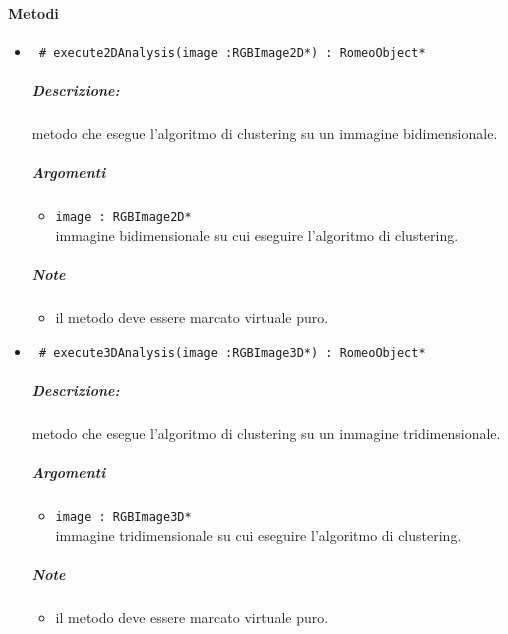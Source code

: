 \paragraph{Metodi\\}
	\begin{itemize}
		\item \color{blue}\verb! # execute2DAnalysis(image :RGBImage2D*) : RomeoObject* !\\
			\color{black}
			\subparagraph{Descrizione:} metodo che esegue l'algoritmo di clustering su un immagine bidimensionale.
			\subparagraph{Argomenti}
				\begin{itemize}
					\item \color{RoyalPurple}\verb!image : RGBImage2D*!\\
					\color{black} immagine bidimensionale su cui eseguire l'algoritmo di clustering.
				\end{itemize}
				\subparagraph{Note}
				\begin{itemize}
					\item il metodo deve essere marcato virtuale puro.
				\end{itemize}
				
		\item \color{blue}\verb! # execute3DAnalysis(image :RGBImage3D*) : RomeoObject* !\\
			\color{black}
			\subparagraph{Descrizione:} metodo che esegue l'algoritmo di clustering su un immagine tridimensionale.
			\subparagraph{Argomenti}
				\begin{itemize}
					\item \color{RoyalPurple}\verb!image : RGBImage3D*!\\
					\color{black} immagine tridimensionale su cui eseguire l'algoritmo di clustering.
				\end{itemize}
				\subparagraph{Note}
				\begin{itemize}
					\item il metodo deve essere marcato virtuale puro.
				\end{itemize}
				

\end{itemize}
